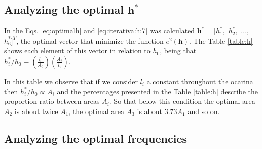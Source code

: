 \documentclass[11pt,twocolumn]{article}
\begin{document}
\subsection{Analyzing the optimal $\mathbf{h^*}$}
In the Eqs. \ref{eq:optimalh} and \ref{eq:iterativa:h:7} was calculated $\mathbf{h^*}=[h_1^*,$ $h_2^*,$ $...,$ $h_6^*]^{T}$, 
the optimal vector that minimize the function $e^2(\mathbf{h})$. 
The Table \ref{table:h} shows each element of this vector in relation to $h_0$, 
being that $ h_{i}^*/h_{0} \equiv  \left( \frac{l_0}{A_0}\right) \left( \frac{A_{i}}{l_{i}}    \right)$.
\begin{table}[h]
\center
{}
\caption{Percentage ratio between $h_{i}^*$ and $h_{0}$.}
\label{table:h}
\end{table}

In this table we observe that if 
we consider $l_{i}$ a constant throughout the ocarina 
then $h_{i}^*/h_{0} \propto A_{i}$ and 
the percentages presented in the Table \ref{table:h} describe the proportion ratio between areas $A_i$.
So that below this condition 
the optimal area $A_{2}$ is about twice $A_{1}$, 
the optimal area $A_{3}$ is about $3.73 A_{1}$   
and so on.




\subsection{Analyzing the optimal frequencies}
\end{document}
